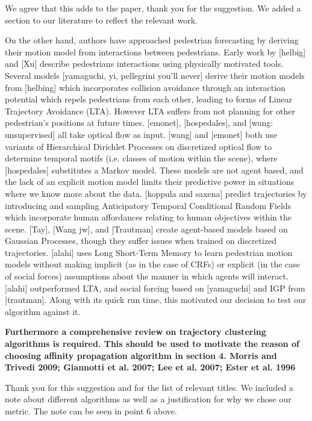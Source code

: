 \documentclass[usenames,dvipsnames]{article}
\providecommand{\response}[1]{
\noindent
\noindent\colorbox{gray!20}{
\parbox{\textwidth}{
\setlength{\parskip}{.1in}
\setlength{\parindent}{.1in}
#1}
}
}
\begin{document}
\begin{enumerate}
We agree that this adds to the paper, thank you for the suggestion. We added a section to our literature to reflect the relevant work.

	\response{On the other hand, authors have approached pedestrian forecasting by deriving their motion model from interactions between pedestrians. Early work by [helbig] and [Xu] describe pedestrians interactions using physically motivated tools. Several models [yamaguchi, yi, pellegrini you’ll never] derive their motion models from [helbing] which incorporates collision avoidance through an interaction potential which repels pedestrians from each other, leading to forms of Linear Trajectory Avoidance (LTA). However LTA suffers from not planning for other pedestrian’s positions at future times. [emonet], [hospedales], and [wang: unsupervised] all take optical flow as input. [wang] and [emonet] both use variants of Hierarchical Dirichlet Processes on discretized optical flow to determine temporal motifs (i.e. classes of motion within the scene), where [hospedales] substitutes a Markov model. These models are not agent based, and the lack of an explicit motion model limits their predictive power in situations where we know more about the data. [koppula and saxena] predict trajectories by introducing and sampling Anticipatory Temporal Conditional Random Fields which incorporate human affordances relating to human objectives within the scene. [Tay], [Wang jw], and [Trautman] create agent-based models based on Gaussian Processes, though they suffer issues when trained on discretized trajectories. [alahi] uses Long Short-Term Memory to learn pedestrian motion models without making implicit (as in the case of CRFs) or explicit (in the case of social forces) assumptions about the manner in which agents will interact. [alahi] outperformed LTA, and social forcing based on [yamaguchi]  and IGP from [trautman]. Along with its quick run time, this motivated our decision to test our algorithm against it.  }

\begin{item}
\textbf{Furthermore a comprehensive review on trajectory clustering algorithms
is required. This should be used to motivate the reason of choosing
affinity propagation algorithm in section 4. 
Morris and Trivedi 2009; Giannotti et al. 2007; Lee et al. 2007;
Ester et al. 1996 }

Thank you for this suggestion and for the list of relevant titles. We included a note about different algorithms as well as a justification for why we chose our metric. The note can be seen in point 6 above.

\end{item}
\end{enumerate}
\end{document}
